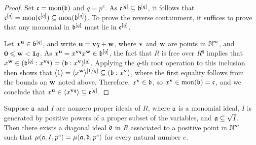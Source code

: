 \documentclass{amsart}
\begin{document}
\begin{proof}
   Set $\mathfrak{c} = \operatorname{mon}(\mathfrak{b})$ and $q=p^e$.
   As $\mathfrak{c}^{[q]} \subseteq \mathfrak{b}^{[q]}$, it follows that $\mathfrak{c}^{[q]} = \operatorname{mon}(\mathfrak{c}^{[q]}) \subseteq \operatorname{mon}(\mathfrak{b}^{[q]})$.
   To prove the reverse containment, it suffices to prove that any monomial in $\mathfrak{b}^{[q]}$ must lie in $\mathfrak{c}^{[q]}$.

   Let $x^{\mathbf{u}} \in \mathfrak{b}^{[q]}$, and write $\mathbf{u} = \mathbf{v}q + \mathbf{w}$, where $\mathbf{v}$ and $\mathbf{w}$ are points in $\mathbb{N}^m$, and $\mathbf{0} \leqslant \mathbf{w} < \mathbf{1}q$.
   As $x^{\mathbf{u}} = x^{\mathbf{v}q} x^{\mathbf{w}} \in \mathfrak{b}^{[q]}$, the fact that
   $R$ is free over $R^q$ implies that $x^{\mathbf{w}} \in ( \mathfrak{b}^{[q]}: x^{\mathbf{v}q}) = (\mathfrak{b}:x^{\mathbf{v}})^{[q]}$.
   Applying the $q$-th root operation to this inclusion then shows that $\langle 1 \rangle = \langle x^{\mathbf{w}} \rangle^{[1/q]}  \subseteq (\mathfrak{b}: x^{\mathbf{v}})$,  where the first equality follows from the bounds on $\mathbf{w}$ noted above.   Therefore, $x^{\mathbf{v}} \in \mathfrak{b}$, so $x^{\mathbf{v}} \in \operatorname{mon}(\mathfrak{b}) = \mathfrak{c}$, and we conclude that $x^{\mathbf{u}} \in \langle x^{\mathbf{v}q} \rangle \subseteq \mathfrak{c}^{[q]}$.
\end{proof}


\begin{lemma}
   \label{quasi-diagonal to diagonal: L}
   Suppose $\mathfrak{a}$ and $I$ are nonzero proper ideals of 
   $R$, where $\mathfrak{a}$ is a monomial ideal, $I$ is generated by positive powers of a proper subset of the variables, and $\mathfrak{a} \subseteq \sqrt{I}$.
   Then there exists a diagonal ideal $\mathfrak{d}$ in
   $R$ associated to a positive point in $\mathbb{N}^m$ such that $\mu(\mathfrak{a}, I, p^e) = \mu(\mathfrak{a}, \mathfrak{d}, p^e)$ for every natural number $e$.
\end{lemma}
\end{document}
